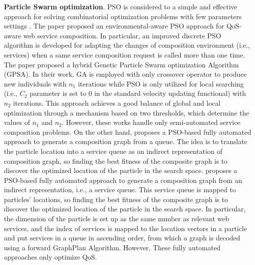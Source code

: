\textbf{Particle Swarm optimization}.
PSO is considered to a simple and effective approach for solving combinatorial optimization problems with few parameters settings \cite{long2009environment}. The paper \cite{long2009environment} proposed an environmental-aware PSO approach for QoS-aware web service composition. In particular, an improved discrete PSO algorithm is developed for adapting the changes of composition environment (i.e., services) when a same service composition request is called more than one time. The paper \cite{liu2007hybrid} proposed a hybrid Genetic Particle Swarm optimization Algorithm (GPSA). In their work, GA is employed with only crossover operator to produce new individuals with $n_1$ iterations while PSO is only utilized for local searching (i.e., $C_2$ parameter is set to 0 in the standard velocity updating functional) with $n_2$ iterations. This approach achieves a good balance of global and local optimization through a  mechanism based on two thresholds, which determine the values of $n_1$ and $n_2$. However, these works \cite{liu2007hybrid,long2009environment} handle only semi-automated service composition problems. On the other hand, \cite{da2016particle} proposes a PSO-based fully automated approach to generate a composition graph from a queue. The idea is to translate the particle location into a service queue as an indirect representation of composition  graph, so finding the best fitness of the composite graph is to discover the optimized location of the particle in the search space. \cite{da2016particle} proposes a PSO-based fully automated approach to generate a composition graph from an indirect representation, i.e., a service queue. This service queue is mapped to particles' locations, so finding the best fitness of the composite graph is to discover the optimized location of the particle in the search space. In particular,  the dimension of the particle is set up as the same number as relevant web services, and the index of services is mapped to the location vectors in a particle and put services in a queue in ascending order, from which a graph is decoded using a forward GraphPlan Algorithm. However, These fully automated approaches only optimize QoS.

